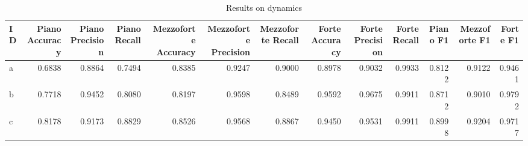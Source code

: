 \begin{table}
\centering
\caption{Results on dynamics}
\label{tb:dynsol}
\begin{tabular}{lrrrrrrrrrrrr}
\toprule
ID &  Piano Accuracy &  Piano Precision &  Piano Recall &  Mezzoforte Accuracy &  Mezzoforte Precision &  Mezzoforte Recall &  Forte Accuracy &  Forte Precision &  Forte Recall &  Piano F1 &  Mezzoforte F1 &  Forte F1 \\
\midrule
 a &          0.6838 &           0.8864 &        0.7494 &               0.8385 &                0.9247 &             0.9000 &          0.8978 &           0.9032 &        0.9933 &    0.8122 &         0.9122 &    0.9461 \\
 b &          0.7718 &           0.9452 &        0.8080 &               0.8197 &                0.9598 &             0.8489 &          0.9592 &           0.9675 &        0.9911 &    0.8712 &         0.9010 &    0.9792 \\
 c &          0.8178 &           0.9173 &        0.8829 &               0.8526 &                0.9568 &             0.8867 &          0.9450 &           0.9531 &        0.9911 &    0.8998 &         0.9204 &    0.9717 \\
\bottomrule
\end{tabular}
\end{table}
